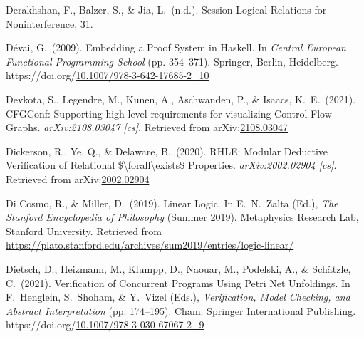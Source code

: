 \documentclass[12pt,twoside]{article}
\begin{document}
{\begin{thebibliography}{1079}
\mdbibitemlabel{}Derakhshan, F., Balzer, S., \& Jia, L.~(n.d.). Session Logical Relations for Noninterference, 31.%

\mdbibitemlabel{}Dévai, G.~(2009). Embedding a Proof System in Haskell. In \emph{Central European Functional Programming School} (pp. 354–371). Springer, Berlin, Heidelberg. https://doi.org/\href{https://dx.doi.org/10.1007/978-3-642-17685-2_10}{10.1007/978-3-642-17685-2\_10}%

\mdbibitemlabel{}Devkota, S., Legendre, M., Kunen, A., Aschwanden, P., \& Isaacs, K.~E.~(2021). CFGConf: Supporting high level requirements for visualizing Control Flow Graphs. \emph{arXiv:2108.03047 {}[cs]}. Retrieved from arXiv:\href{http://arxiv.org/abs/2108.03047}{2108.03047}%

\mdbibitemlabel{}Dickerson, R., Ye, Q., \& Delaware, B.~(2020). RHLE: Modular Deductive Verification of Relational \$\textbackslash{}forall\textbackslash{}exists\$ Properties. \emph{arXiv:2002.02904 {}[cs]}. Retrieved from arXiv:\href{http://arxiv.org/abs/2002.02904}{2002.02904}%

\mdbibitemlabel{}Di Cosmo, R., \& Miller, D.~(2019). Linear Logic. In E.~N.~Zalta (Ed.), \emph{The Stanford Encyclopedia of Philosophy} (Summer 2019). Metaphysics Research Lab, Stanford University. Retrieved from \href{https://plato.stanford.edu/archives/sum2019/entries/logic-linear/}{{\ttfamily https://\hspace{0pt}plato.\hspace{0pt}stanford.\hspace{0pt}edu/\hspace{0pt}archives/\hspace{0pt}sum2019/\hspace{0pt}entries/\hspace{0pt}logic-\hspace{0pt}linear/\hspace{0pt}}}%

\mdbibitemlabel{}Dietsch, D., Heizmann, M., Klumpp, D., Naouar, M., Podelski, A., \& Schätzle, C.~(2021). Verification of Concurrent Programs Using Petri Net Unfoldings. In F.~Henglein, S.~Shoham, \& Y.~Vizel (Eds.), \emph{Verification, Model Checking, and Abstract Interpretation} (pp. 174–195). Cham: Springer International Publishing. https://doi.org/\href{https://dx.doi.org/10.1007/978-3-030-67067-2_9}{10.1007/978-3-030-67067-2\_9}%


\end{thebibliography}}
\end{document}
